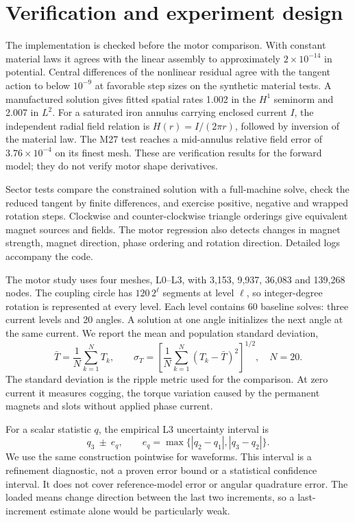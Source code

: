 \documentclass{anvil-paper}
\begin{document}
\section{Verification and experiment design}
The implementation is checked before the motor comparison. With constant
material laws it agrees with the linear assembly to approximately
$2\times10^{-14}$ in potential. Central differences of the nonlinear
residual agree with the tangent action to below $10^{-9}$ at favorable
step sizes on the synthetic material tests. A manufactured solution gives
fitted spatial rates 1.002 in the $H^1$ seminorm and 2.007 in $L^2$.
For a saturated iron annulus carrying enclosed current $I$, the independent
radial field relation is $H(r)=I/(2\pi r)$, followed by inversion of the
material law. The M27 test reaches a mid-annulus relative field error of
$3.76\times10^{-4}$ on its finest mesh. These are verification results
for the forward model; they do not verify motor shape derivatives.

Sector tests compare the constrained solution with a full-machine solve,
check the reduced tangent by finite differences, and exercise positive,
negative and wrapped rotation steps. Clockwise and counter-clockwise
triangle orderings give equivalent magnet sources and fields. The motor
regression also detects changes in magnet strength, magnet direction,
phase ordering and rotation direction. Detailed logs accompany the code.

The motor study uses four meshes, L0--L3, with 3,153, 9,937, 36,083 and
139,268 nodes. The coupling circle has $120\,2^\ell$ segments at level
$\ell$, so integer-degree rotation is represented at every level.
Each level contains 60 baseline solves: three current levels and 20
angles. A solution at one angle initializes the next angle at the same
current. We report the mean and population standard deviation,
\begin{equation}
 \bar T=\frac1N\sum_{k=1}^N T_k,\qquad
 \sigma_T=\left[\frac1N\sum_{k=1}^N(T_k-\bar T)^2\right]^{1/2},
 \quad N=20.
\end{equation}
The standard deviation is the ripple metric used for the comparison.
At zero current it measures cogging, the torque variation caused by the
permanent magnets and slots without applied phase current.

For a scalar statistic $q$, the empirical L3 uncertainty interval is
\begin{equation}
 q_3\ \pm\ e_q,\qquad
 e_q=\max\{|q_2-q_1|,|q_3-q_2|\}.
 \label{eq:band}
\end{equation}
We use the same construction pointwise for waveforms. This interval is a
refinement diagnostic, not a proven error bound or a statistical confidence
interval. It does not cover reference-model error or angular quadrature
error. The loaded means change direction between the last two increments,
so a last-increment estimate alone would be particularly weak.
\end{document}
